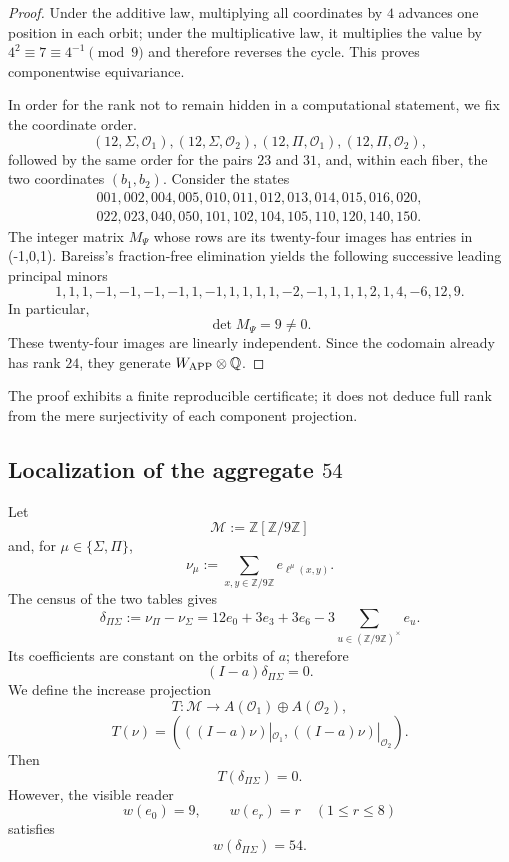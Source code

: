 \begin{proof}
Under the additive law, multiplying all coordinates by \(4\) advances one
position in each orbit; under the multiplicative law, it multiplies the value by
\(4^2\equiv7\equiv4^{-1}\pmod9\) and therefore reverses the cycle. This proves
componentwise equivariance.

In order for the rank not to remain hidden in a computational statement, we fix the coordinate order.
\[
 (12,\Sigma,\mathcal O_1),(12,\Sigma,\mathcal O_2),
 (12,\Pi,\mathcal O_1),(12,\Pi,\mathcal O_2),
\]
followed by the same order for the pairs \(23\) and \(31\), and, within each
fiber, the two coordinates \((b_1,b_2)\). Consider the states
\[
\begin{gathered}
001,002,004,005,010,011,012,013,014,015,016,020,\\
022,023,040,050,101,102,104,105,110,120,140,150.
\end{gathered}
\]
The integer matrix \(M_\Psi\) whose rows are its twenty-four images has
entries in ({-1,0,1}). Bareiss's fraction-free elimination yields the following
successive leading principal minors
\[
1,1,1,-1,-1,-1,-1,1,-1,1,1,1,1,-2,-1,1,1,1,2,1,4,-6,12,9.
\]
In particular,
\[
 \det M_\Psi=9\neq0.
\]
These twenty-four images are linearly independent. Since the
codomain already has rank \(24\), they generate \(W_{\rm APP}\otimes\mathbb Q\).
\end{proof}

The proof exhibits a finite reproducible certificate; it does not deduce full rank
from the mere surjectivity of each component projection.

\subsection{Localization of the aggregate \texorpdfstring{\(54\)}{54}}

Let
\[
 \mathcal M:=\mathbb Z[\mathbb Z/9\mathbb Z]
\]
and, for \(\mu\in\{\Sigma,\Pi\}\),
\[
 \nu_\mu:=\sum_{x,y\in\mathbb Z/9\mathbb Z}
 e_{\ell^\mu(x,y)}.
\]
The census of the two tables gives
\[
 \delta_{\Pi\Sigma}:=\nu_\Pi-\nu_\Sigma
 =12e_0+3e_3+3e_6
 -3\sum_{u\in(\mathbb Z/9\mathbb Z)^\times}e_u.
\]
Its coefficients are constant on the orbits of \(a\); therefore
\[
 (I-a)\delta_{\Pi\Sigma}=0.
\]
We define the increase projection
\[
 T:\mathcal M\longrightarrow
 A(\mathcal O_1)\oplus A(\mathcal O_2),
\]
\[
 T(\nu)=
 \left(((I-a)\nu)|_{\mathcal O_1},
       ((I-a)\nu)|_{\mathcal O_2}\right).
\]
Then
\[
 T(\delta_{\Pi\Sigma})=0.
\]
However, the visible reader
\[
 w(e_0)=9,
 \qquad w(e_r)=r\quad(1\leq r\leq8)
\]
satisfies
\[
 w(\delta_{\Pi\Sigma})=54.
\]

